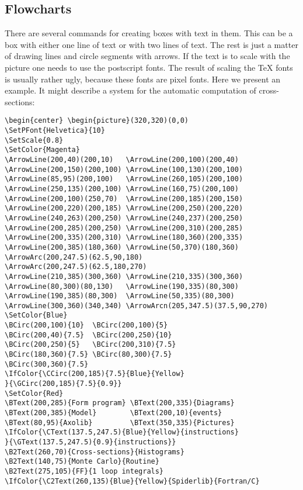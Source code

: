 \documentclass[11pt,a4paper]{article}
\begin{document}
\subsection{Flowcharts}

There are several commands for creating boxes with text in them. This can 
be a box with either one line of text or with two lines of text. The rest 
is just a matter of drawing lines and circle segments with arrows. If the 
text is to scale with the picture one needs to use the postscript fonts. 
The result of scaling the {\TeX} fonts is usually rather ugly, because 
these fonts are pixel fonts. Here we present an example. It might describe 
a system for the automatic computation of cross-sections:
\IfColor{\textBlue}{}
\begin{verbatim}
\begin{center} \begin{picture}(320,320)(0,0)
\SetPFont{Helvetica}{10}
\SetScale{0.8}
\SetColor{Magenta}
\ArrowLine(200,40)(200,10)   \ArrowLine(200,100)(200,40)
\ArrowLine(200,150)(200,100) \ArrowLine(100,130)(200,100)
\ArrowLine(85,95)(200,100)   \ArrowLine(260,105)(200,100)
\ArrowLine(250,135)(200,100) \ArrowLine(160,75)(200,100)
\ArrowLine(200,100)(250,70)  \ArrowLine(200,185)(200,150)
\ArrowLine(200,220)(200,185) \ArrowLine(200,250)(200,220)
\ArrowLine(240,263)(200,250) \ArrowLine(240,237)(200,250)
\ArrowLine(200,285)(200,250) \ArrowLine(200,310)(200,285)
\ArrowLine(200,335)(200,310) \ArrowLine(180,360)(200,335)
\ArrowLine(200,385)(180,360) \ArrowLine(50,370)(180,360)
\ArrowArc(200,247.5)(62.5,90,180)
\ArrowArc(200,247.5)(62.5,180,270)
\ArrowLine(210,385)(300,360) \ArrowLine(210,335)(300,360)
\ArrowLine(80,300)(80,130)   \ArrowLine(190,335)(80,300)
\ArrowLine(190,385)(80,300)  \ArrowLine(50,335)(80,300)
\ArrowLine(300,360)(340,340) \ArrowArcn(205,347.5)(37.5,90,270)
\SetColor{Blue}
\BCirc(200,100){10}  \BCirc(200,100){5}
\BCirc(200,40){7.5}  \BCirc(200,250){10}
\BCirc(200,250){5}   \BCirc(200,310){7.5}
\BCirc(180,360){7.5} \BCirc(80,300){7.5}
\BCirc(300,360){7.5}
\IfColor{\CCirc(200,185){7.5}{Blue}{Yellow}
}{\GCirc(200,185){7.5}{0.9}}
\SetColor{Red}
\BText(200,285){Form program} \BText(200,335){Diagrams}
\BText(200,385){Model}        \BText(200,10){events}
\BText(80,95){Axolib}         \BText(350,335){Pictures}
\IfColor{\CText(137.5,247.5){Blue}{Yellow}{instructions}
}{\GText(137.5,247.5){0.9}{instructions}}
\B2Text(260,70){Cross-sections}{Histograms}
\B2Text(140,75){Monte Carlo}{Routine}
\B2Text(275,105){FF}{1 loop integrals}
\IfColor{\C2Text(260,135){Blue}{Yellow}{Spiderlib}{Fortran/C}

\end{verbatim}
\end{document}
